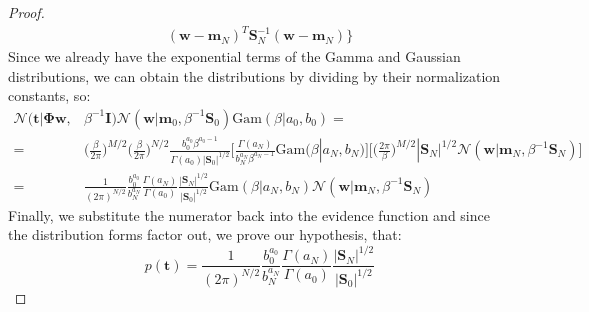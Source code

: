 \begin{proof}
\begin{align*}
            (\mathbf{w} - \mathbf{m}_N)^T\mathbf{S}_N^{-1}(\mathbf{w} - \mathbf{m}_N)\bigg\}
    \end{align*}
    Since we already have the exponential terms of the Gamma and
    Gaussian distributions, we can obtain the distributions by
    dividing by their normalization constants, so:
    \begin{align*}
        \mathcal{N}(\mathbf{t} | \mathbf{\Phi}\mathbf{w},& \beta^{-1}\mathbf{I})
            \mathcal{N}(\mathbf{w} | \mathbf{m}_0, \beta^{-1}\mathbf{S}_0)
            \text{Gam}(\beta | a_0, b_0) = \\
        =& \bigg(\frac{\beta}{2\pi}\bigg)^{M/2} 
            \bigg(\frac{\beta}{2\pi}\bigg)^{N/2} 
            \frac{b_0^{a_0}\beta^{a_0 - 1}}{\Gamma(a_0)|\mathbf{S}_0|^{1/2}}
            \bigg[\frac{\Gamma(a_N)}{b_N^{a_N}\beta^{a_N - 1}}
            \text{Gam}(\beta | a_N, b_N)\bigg]
            \bigg[\bigg(\frac{2\pi}{\beta}\bigg)^{M/2} |\mathbf{S}_N|^{1/2}
            \mathcal{N}(\mathbf{w} | \mathbf{m}_N, \beta^{-1}\mathbf{S}_N)\bigg] \\
        =& \frac{1}{(2\pi)^{N / 2}} \frac{b_0^{a_0}}{b_N^{a_N}}
            \frac{\Gamma(a_N)}{\Gamma(a_0)} \frac{|\mathbf{S}_N|^{1/2}}{|\mathbf{S}_0|^{1/2}}
            \text{Gam}(\beta | a_N, b_N) 
            \mathcal{N}(\mathbf{w} | \mathbf{m}_N, \beta^{-1}\mathbf{S}_N)
    \end{align*}
    Finally, we substitute the numerator back into the evidence function
    and since the distribution forms factor out, we prove our hypothesis, that:
    \begin{equation*}\tag{3.118}
        p(\mathbf{t}) = \frac{1}{(2\pi)^{N / 2}} \frac{b_0^{a_0}}{b_N^{a_N}}
        \frac{\Gamma(a_N)}{\Gamma(a_0)} \frac{|\mathbf{S}_N|^{1/2}}{|\mathbf{S}_0|^{1/2}}
    \end{equation*}
\end{proof}
